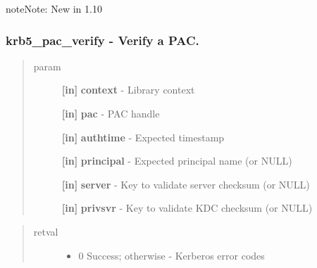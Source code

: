\documentclass[letterpaper,10pt,english]{sphinxmanual}
\begin{document}
\begin{notice}{note}{Note:}
New in 1.10
\end{notice}


\subsubsection{krb5\_pac\_verify -  Verify a PAC.}
\label{appdev/refs/api/krb5_pac_verify::doc}\label{appdev/refs/api/krb5_pac_verify:krb5-pac-verify-verify-a-pac}

\begin{fulllineitems}
\label{appdev/refs/api/krb5_pac_verify:krb5_pac_verify}
\end{fulllineitems}

\begin{quote}\begin{description}
\item[{param}] \leavevmode
\textbf{{[}in{]}} \textbf{context} - Library context

\textbf{{[}in{]}} \textbf{pac} - PAC handle

\textbf{{[}in{]}} \textbf{authtime} - Expected timestamp

\textbf{{[}in{]}} \textbf{principal} - Expected principal name (or NULL)

\textbf{{[}in{]}} \textbf{server} - Key to validate server checksum (or NULL)

\textbf{{[}in{]}} \textbf{privsvr} - Key to validate KDC checksum (or NULL)

\end{description}\end{quote}
\begin{quote}\begin{description}
\item[{retval}] \leavevmode\begin{itemize}
\item {} 
0   Success; otherwise - Kerberos error codes

\end{itemize}

\end{description}\end{quote}
\end{document}
